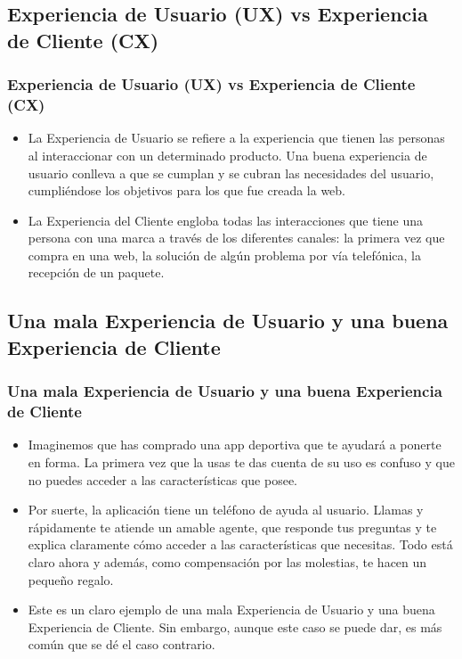 \documentclass[11pt]{beamer}
\begin{document}
\subsection{Experiencia de Usuario (UX) vs Experiencia de Cliente (CX)}
\begin{frame}
\frametitle{Experiencia de Usuario (UX) vs Experiencia de Cliente (CX)}
\begin{itemize}
\item La Experiencia de Usuario se refiere a la experiencia que tienen las personas al interaccionar con un determinado producto. Una buena experiencia de usuario conlleva a que se cumplan y se cubran las necesidades del usuario, cumpliéndose los objetivos para los que fue creada la web.
\item La Experiencia del Cliente engloba todas las interacciones que tiene una persona con una marca a través de los diferentes canales: la primera vez que compra en una web, la solución de algún problema por vía telefónica, la recepción de un paquete.
\end{itemize}
\end{frame}

\subsection{Una mala Experiencia de Usuario y una buena Experiencia de Cliente}
\begin{frame}
\frametitle{Una mala Experiencia de Usuario y una buena Experiencia de Cliente}
\begin{itemize}
\item Imaginemos que has comprado una app deportiva que te ayudará a ponerte en forma. La primera vez que la usas te das cuenta de su uso es confuso y que no puedes acceder a las características que posee.
\item Por suerte, la aplicación tiene un teléfono de ayuda al usuario. Llamas y rápidamente te atiende un amable agente, que responde tus preguntas y te explica claramente cómo acceder a las características que necesitas. Todo está claro ahora y además, como compensación por las molestias, te hacen un pequeño regalo.
\item Este es un claro ejemplo de una mala Experiencia de Usuario y una buena Experiencia de Cliente. Sin embargo, aunque este caso se puede dar, es más común que se dé el caso contrario.
\end{itemize}
\end{frame}
\end{document}
